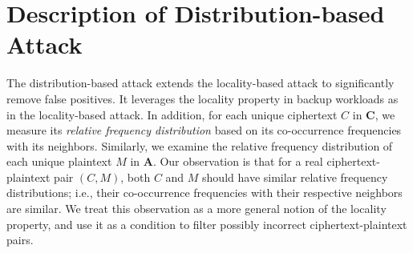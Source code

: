

\section{Description of Distribution-based Attack}
\label{sec:distribution-attack-description}

The distribution-based attack extends the locality-based attack \cite{li17} to
significantly remove false positives.  It leverages the locality property in
backup workloads as in the locality-based attack.  In addition, for each
unique ciphertext $C$ in $\mathbf{C}$, we measure its {\em relative frequency
distribution} based on its co-occurrence frequencies with its neighbors.
Similarly, we examine the relative frequency distribution of each unique
plaintext $M$ in $\mathbf{A}$.  Our observation is that for a real
ciphertext-plaintext pair $(C, M)$, both $C$ and $M$ should have similar
relative frequency distributions; i.e., their co-occurrence frequencies with
their respective neighbors are similar.  We treat this observation as a more
general notion of the locality property, and use it as a condition to filter
possibly incorrect ciphertext-plaintext pairs. 

